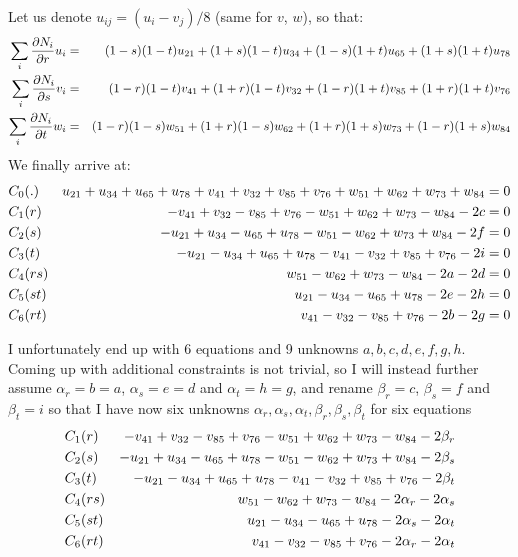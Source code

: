 Let us denote $u_{ij}=(u_i-v_j)/8$ (same for $v$, $w$), so that:
\begin{eqnarray}
\sum_i \frac{\partial N_i}{\partial r} u_i 
&=& (1-s)(1-t)u_{21}
+ (1+s)(1-t)u_{34}
+ (1-s)(1+t)u_{65}
+ (1+s)(1+t)u_{78} \nonumber\\
\sum_i \frac{\partial N_i}{\partial s} v_i 
&=& (1-r)(1-t)v_{41}
+ (1+r)(1-t)v_{32}
+ (1-r)(1+t)v_{85}
+ (1+r)(1+t)v_{76} \nonumber\\
\sum_i \frac{\partial N_i}{\partial t} w_i 
&=& 
  (1-r)(1-s)w_{51}
+ (1+r)(1-s)w_{62}
+ (1+r)(1+s)w_{73}
+ (1-r)(1+s)w_{84} \nonumber
\end{eqnarray}
We finally arrive at:
\begin{eqnarray}
C_0   &(.)  &  u_{21} + u_{34} + u_{65} + u_{78} + v_{41} + v_{32} + v_{85} + v_{76} + w_{51} + w_{62} + w_{73} + w_{84} =0  \nonumber\\
C_1   &(r)  &  -v_{41} +v_{32} -v_{85} + v_{76} - w_{51} + w_{62} + w_{73} -w_{84} -2c =0\nonumber\\ 
C_2   &(s)  &  -u_{21} +u_{34} -u_{65} + u_{78} - w_{51} - w_{62} + w_{73} +w_{84} -2f =0 \nonumber\\ 
C_3   &(t)  &  -u_{21} -u_{34} +u_{65} + u_{78} - v_{41} - v_{32} + v_{85} +v_{76} -2i =0 \nonumber\\ 
C_4   &(rs) &  w_{51} -w_{62} +w_{73} - w_{84}  -2a -2d =0  \nonumber\\
C_5   &(st) &  u_{21} -u_{34} -u_{65} + u_{78}  -2e -2h =0  \nonumber\\
C_6   &(rt) &  v_{41} -v_{32} -v_{85} + v_{76}  -2b -2g =0  \nonumber
\end{eqnarray}

I unfortunately end up with 6 equations and 9 unknowns $a,b,c,d,e,f,g,h$.
Coming up with additional constraints is not trivial, so I will instead further assume 
$\alpha_r=b=a$, $\alpha_s=e=d$ and $\alpha_t=h=g$, and rename 
$\beta_r=c$, $\beta_s=f$ and $\beta_t=i$ so that
I have now six unknowns $\alpha_r,\alpha_s,\alpha_t,\beta_r,\beta_s,\beta_t$ for six equations
\begin{eqnarray}
C_1   &(r)  &  -v_{41} +v_{32} -v_{85} + v_{76} - w_{51} + w_{62} + w_{73} -w_{84} -2\beta_r \nonumber\\ 
C_2   &(s)  &  -u_{21} +u_{34} -u_{65} + u_{78} - w_{51} - w_{62} + w_{73} +w_{84} -2\beta_s \nonumber\\ 
C_3   &(t)  &  -u_{21} -u_{34} +u_{65} + u_{78} - v_{41} - v_{32} + v_{85} +v_{76} -2\beta_t \nonumber\\ 
C_4   &(rs) &  w_{51} -w_{62} +w_{73} - w_{84}  -2\alpha_r -2\alpha_s   \nonumber\\
C_5   &(st) &  u_{21} -u_{34} -u_{65} + u_{78}  -2\alpha_s -2\alpha_t   \nonumber\\
C_6   &(rt) &  v_{41} -v_{32} -v_{85} + v_{76}  -2\alpha_r -2\alpha_t   \nonumber
\end{eqnarray}


